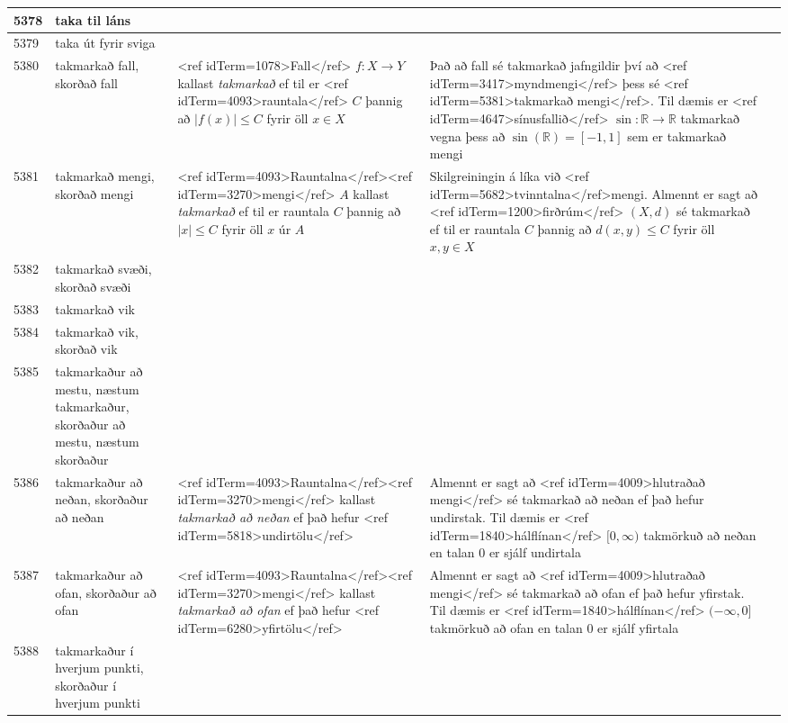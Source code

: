 \begin{longtable}{p{}|p{}|p{}|p{}|p{}}
\hline
5378 & taka til láns &  &  &  \\
\hline
5379 & taka út fyrir sviga &  &  &  \\
\hline
5380 & takmarkað fall, skorðað fall & <ref idTerm=1078>Fall</ref> $f: X \to Y$ kallast \textit{takmarkað} ef til er <ref idTerm=4093>rauntala</ref> $C$ þannig að $|f(x)| \leq C$ fyrir öll $x \in X$ & Það að fall sé takmarkað jafngildir því að <ref idTerm=3417>myndmengi</ref> þess sé <ref idTerm=5381>takmarkað mengi</ref>. Til dæmis er <ref idTerm=4647>sínusfallið</ref> $\sin : \mathbb{R} \to \mathbb{R}$ takmarkað vegna þess að $\sin(\mathbb{R})=[-1,1]$ sem er takmarkað mengi &  \\
\hline
5381 & takmarkað mengi, skorðað mengi & <ref idTerm=4093>Rauntalna</ref><ref idTerm=3270>mengi</ref> $A$ kallast \textit{takmarkað} ef til er rauntala $C$ þannig að $|x| \leq C$ fyrir öll $x$ úr $A$ & Skilgreiningin á líka við <ref idTerm=5682>tvinntalna</ref>mengi. Almennt er sagt að <ref idTerm=1200>firðrúm</ref> $(X,d)$ sé takmarkað ef til er rauntala $C$ þannig að $d(x,y) \leq C$ fyrir öll $x,y \in X$ &  \\
\hline
5382 & takmarkað svæði, skorðað svæði &  &  &  \\
\hline
5383 & takmarkað vik &  &  &  \\
\hline
5384 & takmarkað vik, skorðað vik &  &  &  \\
\hline
5385 & takmarkaður að mestu, næstum takmarkaður, skorðaður að mestu, næstum skorðaður &  &  &  \\
\hline
5386 & takmarkaður að neðan, skorðaður að neðan & <ref idTerm=4093>Rauntalna</ref><ref idTerm=3270>mengi</ref> kallast \textit{takmarkað að neðan} ef það hefur <ref idTerm=5818>undirtölu</ref> & Almennt er sagt að <ref idTerm=4009>hlutraðað mengi</ref> sé takmarkað að neðan ef það hefur undirstak. Til dæmis er <ref idTerm=1840>hálflínan</ref> $[0, \infty)$ takmörkuð að neðan en talan 0 er sjálf undirtala &  \\
\hline
5387 & takmarkaður að ofan, skorðaður að ofan & <ref idTerm=4093>Rauntalna</ref><ref idTerm=3270>mengi</ref> kallast \textit{takmarkað að ofan} ef það hefur <ref idTerm=6280>yfirtölu</ref> & Almennt er sagt að <ref idTerm=4009>hlutraðað mengi</ref> sé takmarkað að ofan ef það hefur yfirstak. Til dæmis er <ref idTerm=1840>hálflínan</ref> $(-\infty, 0]$ takmörkuð að ofan en talan 0 er sjálf yfirtala &  \\
\hline
5388 & takmarkaður í hverjum punkti, skorðaður í hverjum punkti &  &  &  \\

\end{longtable}
